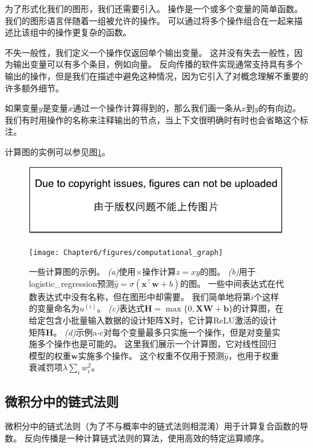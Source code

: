 为了形式化我们的图形，我们还需要引入。
操作是一个或多个变量的简单函数。
我们的图形语言伴随着一组被允许的操作。
可以通过将多个操作组合在一起来描述比该组中的操作更复杂的函数。


不失一般性，我们定义一个操作仅返回单个输出变量。
这并没有失去一般性，因为输出变量可以有多个条目，例如向量。
反向传播的软件实现通常支持具有多个输出的操作，但是我们在描述中避免这种情况，因为它引入了对概念理解不重要的许多额外细节。

如果变量$y$是变量$x$通过一个操作计算得到的，那么我们画一条从$x$到$y$的有向边。
我们有时用操作的名称来注释输出的节点，当上下文很明确时有时也会省略这个标注。

计算图的实例可以参见图\ref{fig:chap6_computational_graph}。
\begin{figure}[!htb]
\ifOpenSource
\centerline{\includegraphics{figure.pdf}}
\else
\centerline{\texttt{[image: Chapter6/figures/computational\_graph]}}
\fi
\captionsetup{singlelinecheck=off}
\caption{一些计算图的示例。
\emph{(a)}使用$\times$操作计算$z = xy$的图。 
\emph{(b)}用于\gls{logistic_regression}预测$\hat{y} = \sigma(\bm{x}^\top \bm{w} + b)$的图。 一些中间表达式在代数表达式中没有名称，但在图形中却需要。
我们简单地将第$i$个这样的变量命名为$u^{(i)}$。
\emph{(c)}表达式$\bm{H} = \max \{ 0, \bm{X}\bm{W}+ \bm{b} \}$的计算图，在给定包含小批量输入数据的设计矩阵$\bm{X}$时，它计算\gls{ReLU}激活的设计矩阵$\bm{H}$。
\emph{(d)}示例a-c对每个变量最多只实施一个操作，但是对变量实施多个操作也是可能的。 这里我们展示一个计算图，它对线性回归模型的权重$\bm{w}$实施多个操作。
这个权重不仅用于预测$\hat{y}$，也用于权重衰减罚项$\lambda \sum_i w_i^2$。}
\label{fig:chap6_computational_graph}
\end{figure}

\subsection{微积分中的链式法则}
\label{sec:chain_rule_of_calculus}

微积分中的链式法则（为了不与概率中的链式法则相混淆）用于计算复合函数的导数。
反向传播是一种计算链式法则的算法，使用高效的特定运算顺序。

